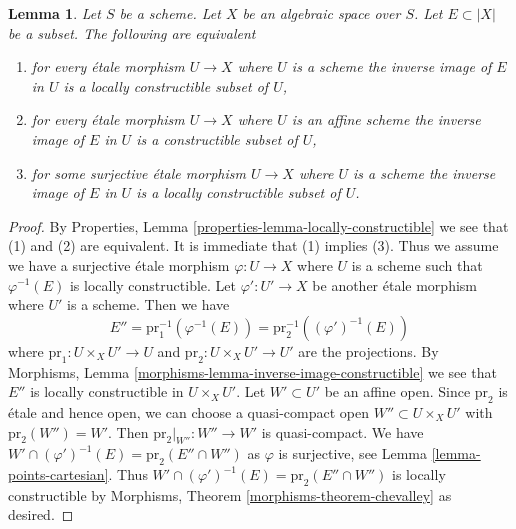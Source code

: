 \documentclass[10pt,a4paper]{amsart}
\theoremstyle{plain}
\newtheorem{lemma}[subsection]{Lemma}
\theoremstyle{definition}
\theoremstyle{remark}
\numberwithin{equation}{subsection}
\begin{document}
\begin{lemma}
\label{lemma-locally-constructible}
Let $S$ be a scheme. Let $X$ be an algebraic space over $S$.
Let $E \subset |X|$ be a subset. The following are equivalent
\begin{enumerate}
\item for every \'etale morphism $U \to X$ where $U$ is a
scheme the inverse image of $E$ in $U$ is a locally constructible
subset of $U$,
\item for every \'etale morphism $U \to X$ where $U$ is an
affine scheme the inverse image of $E$ in $U$ is a constructible
subset of $U$,
\item for some surjective \'etale morphism $U \to X$ where $U$ is a
scheme the inverse image of $E$ in $U$ is a locally constructible
subset of $U$.
\end{enumerate}
\end{lemma}

\begin{proof}
By Properties, Lemma \ref{properties-lemma-locally-constructible}
we see that (1) and (2) are equivalent. It is immediate that (1)
implies (3). Thus we assume we have a surjective \'etale morphism
$\varphi : U \to X$ where $U$ is a scheme such that $\varphi^{-1}(E)$
is locally constructible. Let $\varphi' : U' \to X$ be another
\'etale morphism where $U'$ is a scheme. Then we have
$$
E'' = \text{pr}_1^{-1}(\varphi^{-1}(E)) = \text{pr}_2^{-1}((\varphi')^{-1}(E))
$$
where $\text{pr}_1 : U \times_X U' \to U$ and
$\text{pr}_2 : U \times_X U' \to U'$ are the projections.
By Morphisms, Lemma \ref{morphisms-lemma-inverse-image-constructible}
we see that $E''$ is locally constructible in $U \times_X U'$.
Let $W' \subset U'$ be an affine open. Since $\text{pr}_2$ is
\'etale and hence open, we can choose a quasi-compact open
$W'' \subset U \times_X U'$ with $\text{pr}_2(W'') = W'$.
Then $\text{pr}_2|_{W''} : W'' \to W'$ is quasi-compact.
We have $W' \cap (\varphi')^{-1}(E) = \text{pr}_2(E'' \cap W'')$
as $\varphi$ is surjective, see Lemma \ref{lemma-points-cartesian}.
Thus $W' \cap (\varphi')^{-1}(E) = \text{pr}_2(E'' \cap W'')$
is locally constructible by
Morphisms, Theorem \ref{morphisms-theorem-chevalley} as desired.
\end{proof}
\end{document}
